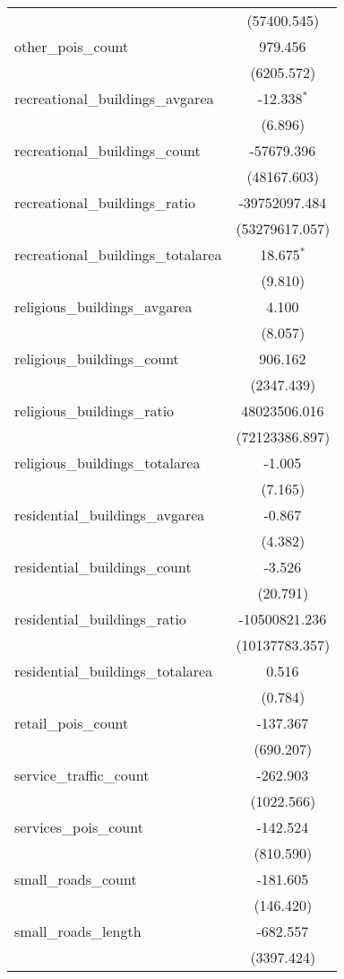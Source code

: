 \begin{table}[!htbp]
\begin{tabular}{@{\extracolsep{5pt}}lc}
  & (57400.545) \\
 other_pois_count & 979.456$^{}$ \\
  & (6205.572) \\
 recreational_buildings_avgarea & -12.338$^{*}$ \\
  & (6.896) \\
 recreational_buildings_count & -57679.396$^{}$ \\
  & (48167.603) \\
 recreational_buildings_ratio & -39752097.484$^{}$ \\
  & (53279617.057) \\
 recreational_buildings_totalarea & 18.675$^{*}$ \\
  & (9.810) \\
 religious_buildings_avgarea & 4.100$^{}$ \\
  & (8.057) \\
 religious_buildings_count & 906.162$^{}$ \\
  & (2347.439) \\
 religious_buildings_ratio & 48023506.016$^{}$ \\
  & (72123386.897) \\
 religious_buildings_totalarea & -1.005$^{}$ \\
  & (7.165) \\
 residential_buildings_avgarea & -0.867$^{}$ \\
  & (4.382) \\
 residential_buildings_count & -3.526$^{}$ \\
  & (20.791) \\
 residential_buildings_ratio & -10500821.236$^{}$ \\
  & (10137783.357) \\
 residential_buildings_totalarea & 0.516$^{}$ \\
  & (0.784) \\
 retail_pois_count & -137.367$^{}$ \\
  & (690.207) \\
 service_traffic_count & -262.903$^{}$ \\
  & (1022.566) \\
 services_pois_count & -142.524$^{}$ \\
  & (810.590) \\
 small_roads_count & -181.605$^{}$ \\
  & (146.420) \\
 small_roads_length & -682.557$^{}$ \\
  & (3397.424) \\

\end{tabular}
\end{table}
